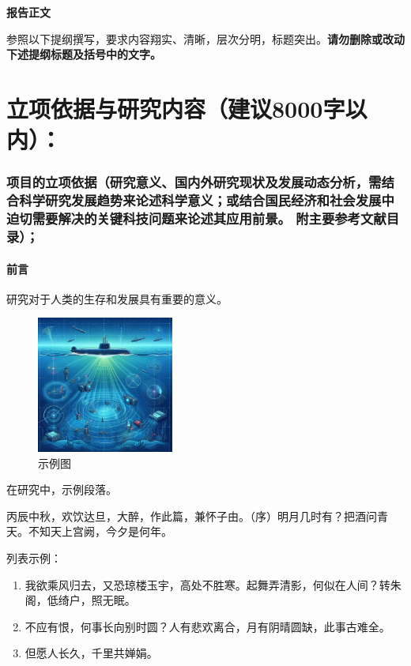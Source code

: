 \documentclass[12pt,a4paper]{article}
\begin{document}
\begin{center}
    \sanhao \textbf{\kaishu 报告正文}
\end{center}

{\sihao \kaishu 参照以下提纲撰写，要求内容翔实、清晰，层次分明，标题突出。\textbf{\color[rgb]{0,0.439,0.753}请勿删除或改动下述提纲标题及括号中的文字。}}
\vspace*{2pt}

\part{\textbf{立项依据与研究内容}（建议8000字以内）：}

\section{\textbf{项目的立项依据}（研究意义、国内外研究现状及发展动态分析，需结合科学研究发展趋势来论述科学意义；或结合国民经济和社会发展中迫切需要解决的关键科技问题来论述其应用前景。\hskip -8pt 附主要参考文献目录）；}

\subsection{\textbf{前言}}

研究对于人类的生存和发展具有重要的意义\cite{sun2021review,mignerey2022experimental,RN73}。

\begin{figure}[!h]
    \centering
    \includegraphics[width = 0.4\textwidth]{senarios.jpg}
    \caption{示例图}
    \label{fig:1_scene}
\end{figure}

在研究中\cite{RN35,RN33,RN34}，示例段落。

丙辰中秋，欢饮达旦，大醉，作此篇，兼怀子由。（序）明月几时有？把酒问青天。不知天上宫阙，今夕是何年。

列表示例：
\begin{enumerate}[(1)]
    \setlength{\itemsep}{0.1em}
    \item 我欲乘风归去，又恐琼楼玉宇，高处不胜寒。起舞弄清影，何似在人间？转朱阁，低绮户，照无眠。
    \item 不应有恨，何事长向别时圆？人有悲欢离合，月有阴晴圆缺，此事古难全。
    \item 但愿人长久，千里共婵娟。
\end{enumerate}
\end{document}
